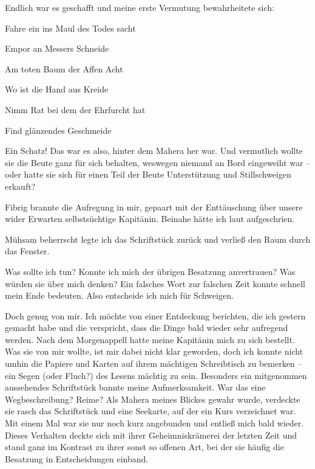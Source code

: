 Endlich war es geschafft und meine erste Vermutung bewahrheitete sich:

\vspace{0.5cm}\noindent
\begin{itshape}Fahre ein ins Maul des Todes sacht

Empor an Messers Schneide

\vspace{0.5cm}\noindent
Am toten Baum der Affen Acht

Wo ist die Hand aus Kreide

\vspace{0.5cm}\noindent
Nimm Rat bei dem der Ehrfurcht hat

Find glänzendes Geschmeide\end{itshape}

\vspace{0.5cm}\noindent
Ein Schatz! Das war es also, hinter dem Mahera her war. Und vermutlich wollte sie die Beute ganz für sich behalten, weswegen niemand an Bord eingeweiht war -- oder hatte sie sich für einen Teil der Beute Unterstützung und Stillschweigen erkauft?

Fibrig brannte die Aufregung in mir, gepaart mit der Enttäuschung über unsere wider Erwarten selbstsüchtige Kapitänin. Beinahe hätte ich laut aufgeschrien.

Mühsam beherrscht legte ich das Schriftstück zurück und verließ den Raum durch das Fenster.

Was sollte ich tun? Konnte ich mich der übrigen Besatzung anvertrauen? Was würden sie über mich denken? Ein falsches Wort zur falschen Zeit konnte schnell mein Ende bedeuten. Also entscheide ich mich für Schweigen.

\vspace{0.5cm}\noindent
Doch genug von mir. Ich möchte von einer Entdeckung berichten, die ich gestern gemacht habe und die verspricht, dass die Dinge bald wieder sehr aufregend werden. Nach dem Morgenappell hatte meine Kapitänin mich zu sich bestellt. Was sie von mir wollte, ist mir dabei nicht klar geworden, doch ich konnte nicht umhin die Papiere und Karten auf ihrem mächtigen Schreibtisch zu bemerken -- ein Segen (oder Fluch?) des Lesens mächtig zu sein. Besonders ein mitgenommen aussehendes Schriftstück bannte meine Aufmerksamkeit. War das eine Wegbeschreibung? Reime? Als Mahera meines Blickes gewahr wurde, verdeckte sie rasch das Schriftstück und eine Seekarte, auf der ein Kurs verzeichnet war. Mit einem Mal war sie nur noch kurz angebunden und entließ mich bald wieder. Dieses Verhalten deckte sich mit ihrer Geheimniskrämerei der letzten Zeit und stand ganz im Kontrast zu ihrer sonst so offenen Art, bei der sie häufig die Besatzung in Entscheidungen einband.

